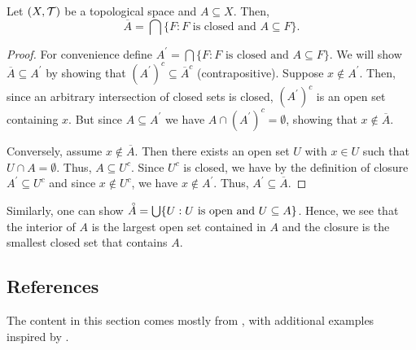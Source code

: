 \documentclass{article}
\begin{document}
\begin{proposition}
 Let $(X,\mathcal{T})$ be a topological space and $A\subseteq X$. Then,
 \begin{equation*}
     \overline{A} = \bigcap \{F \colon F \text{ is closed and } A \subseteq F\}.
 \end{equation*}
\end{proposition}
\begin{proof}
For convenience define $A^\prime = \bigcap \{F \colon F \text{ is closed and } A \subseteq F\}$. We will show $ \overline{A}\subseteq A^\prime$ by showing that $(A^\prime)^c \subseteq \overline{A}^c$ (contrapositive). Suppose $x\not \in A^\prime$. Then, since an arbitrary intersection of closed sets is closed, $(A^\prime)^c$ is an open set containing $x$. But since $A \subseteq A^\prime$ we have $A\cap (A^\prime)^c = \emptyset$, showing that $x\not \in \overline{A}$. 

Conversely, assume $x\not \in \overline{A}$. Then there exists an open set $U$ with $x\in U$ such that $U\cap A = \emptyset$. Thus, $A\subseteq U^c$. Since $U^c$ is closed, we have by the definition of closure $A^\prime \subseteq U^c$ and since $x\not \in U^c$, we have $x\not \in A^\prime$. Thus, $A^\prime\subseteq \overline{A}$.
\end{proof}

Similarly, one can show $\accentset{\circ} A =\bigcup \{U: U \text{ is open and } U \subseteq A \}$. Hence, we see that the interior of $A$ is the largest open set contained in $A$ and the closure is the smallest closed set that contains $A$.


\subsection{References}
The content in this section comes mostly from \cite{tastetopology}, with additional examples inspired by \cite{marcoux2019}.



\newpage

 

\end{document}
